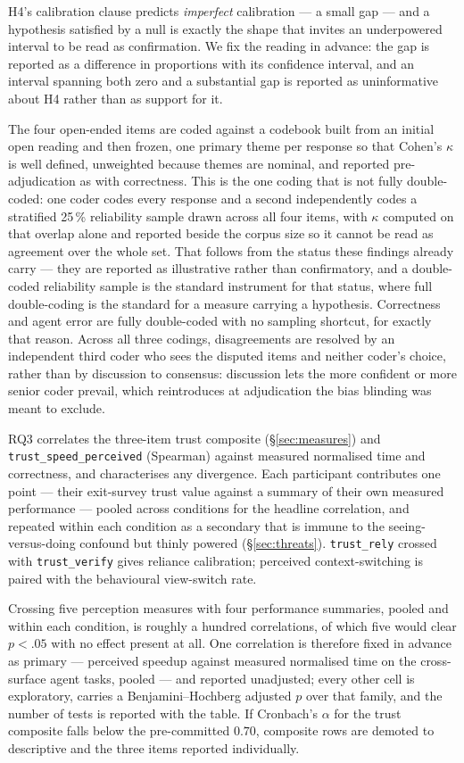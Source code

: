 \documentclass[acmsmall,review,screen]{acmart}
\newcommand{\code}[1]{\texttt{#1}}
\begin{document}
H4's calibration clause predicts \emph{imperfect} calibration --- a small gap ---
and a hypothesis satisfied by a null is exactly the shape that invites an
underpowered interval to be read as confirmation. We fix the reading in advance:
the gap is reported as a difference in proportions with its confidence interval,
and an interval spanning both zero and a substantial gap is reported as
uninformative about H4 rather than as support for it.

The four open-ended items are coded against a codebook built from
an initial open reading and then frozen, one primary theme per response so that
Cohen's $\kappa$ is well defined, unweighted because themes are nominal, and
reported pre-adjudication as with correctness. This is the one coding that is not
fully double-coded: one coder codes every response and a second independently
codes a stratified 25\,\% reliability sample drawn across all four items, with
$\kappa$ computed on that overlap alone and reported beside the corpus size so it
cannot be read as agreement over the whole set. That follows from the status
these findings already carry --- they are reported as illustrative rather than
confirmatory, and a double-coded reliability sample is the standard instrument
for that status, where full double-coding is the standard for a measure carrying
a hypothesis. Correctness and agent error are fully double-coded with no sampling
shortcut, for exactly that reason. Across all three codings,
disagreements are resolved by an independent third coder who sees the disputed
items and neither coder's choice, rather than by discussion to consensus:
discussion lets the more confident or more senior coder prevail, which
reintroduces at adjudication the bias blinding was meant to exclude.

RQ3 correlates the three-item trust composite (\S\ref{sec:measures}) and
\code{trust\_speed\_perceived} (Spearman) against measured normalised time and
correctness, and characterises any divergence. Each participant contributes one point --- their exit-survey trust
value against a summary of their own measured performance --- pooled across
conditions for the headline correlation, and repeated within each condition as a
secondary that is immune to the seeing-versus-doing confound but thinly powered
(\S\ref{sec:threats}). \code{trust\_rely} crossed with \code{trust\_verify} gives reliance
calibration; perceived context-switching is paired with the behavioural
view-switch rate.

Crossing five perception measures with four performance summaries, pooled and
within each condition, is roughly a hundred correlations, of which five would
clear $p < .05$ with no effect present at all. One correlation is therefore fixed
in advance as primary --- perceived speedup against measured normalised time on
the cross-surface agent tasks, pooled --- and reported unadjusted; every other
cell is exploratory, carries a Benjamini--Hochberg adjusted $p$ over that family,
and the number of tests is reported with the table. If Cronbach's $\alpha$ for the
trust composite falls below the pre-committed $0.70$, composite rows are demoted
to descriptive and the three items reported individually.
\end{document}
